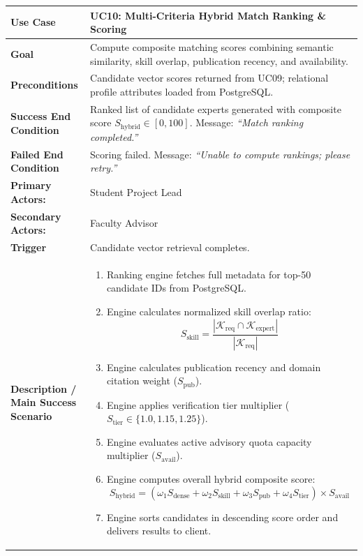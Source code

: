 \begin{table}[H]
\centering
\small
\begin{tabularx}{\textwidth}{|l|X|}
\hline
\rowcolor{lightgray!40} \textbf{Use Case} & \textbf{UC10: Multi-Criteria Hybrid Match Ranking \& Scoring} \\ \hline
\textbf{Goal} & Compute composite matching scores combining semantic similarity, skill overlap, publication recency, and availability. \\ \hline
\textbf{Preconditions} & Candidate vector scores returned from UC09; relational profile attributes loaded from PostgreSQL. \\ \hline
\textbf{Success End Condition} & Ranked list of candidate experts generated with composite score $S_{\text{hybrid}} \in [0, 100]$. Message: \textit{``Match ranking completed.''} \\ \hline
\textbf{Failed End Condition} & Scoring failed. Message: \textit{``Unable to compute rankings; please retry.''} \\ \hline
\textbf{Primary Actors:} & Student Project Lead \\
\textbf{Secondary Actors:} & Faculty Advisor \\ \hline
\textbf{Trigger} & Candidate vector retrieval completes. \\ \hline
\textbf{Description / Main Success Scenario} &
\begin{enumerate}[leftmargin=*]
    \item Ranking engine fetches full metadata for top-50 candidate IDs from PostgreSQL.
    \item Engine calculates normalized skill overlap ratio:
    $$S_{\text{skill}} = \frac{|\mathcal{K}_{\text{req}} \cap \mathcal{K}_{\text{expert}}|}{|\mathcal{K}_{\text{req}}|}$$
    \item Engine calculates publication recency and domain citation weight ($S_{\text{pub}}$).
    \item Engine applies verification tier multiplier ($S_{\text{tier}} \in \{1.0, 1.15, 1.25\}$).
    \item Engine evaluates active advisory quota capacity multiplier ($S_{\text{avail}}$).
    \item Engine computes overall hybrid composite score:
    $$S_{\text{hybrid}} = \left(\omega_1 S_{\text{dense}} + \omega_2 S_{\text{skill}} + \omega_3 S_{\text{pub}} + \omega_4 S_{\text{tier}}\right) \times S_{\text{avail}}$$
    \item Engine sorts candidates in descending score order and delivers results to client.

\end{enumerate}
\end{tabularx}
\end{table}
